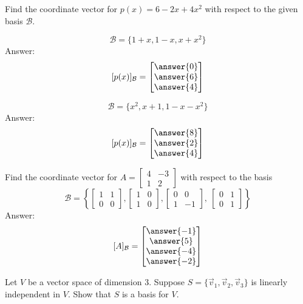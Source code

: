 \documentclass{ximera}
\begin{document}
\begin{problem}
Find the coordinate vector for $p(x)=6-2x+4x^2$ with respect to the given basis $\mathcal{B}$.

\begin{problem}\label{prob:coordvectors1}
$$\mathcal{B}=\{1 + x, 1 - x, x + x^{2}\}$$
Answer:
$$[p(x)]_{\mathcal{B}}=\begin{bmatrix}\answer{0}\\\answer{6}\\\answer{4}\end{bmatrix}$$
\end{problem}

\begin{problem}\label{prob:coordvectors2}
$$\mathcal{B}=\{x^{2}, x + 1, 1 - x - x^{2}\}$$
Answer:
$$[p(x)]_{\mathcal{B}}=\begin{bmatrix}\answer{8}\\\answer{2}\\\answer{4}\end{bmatrix}$$
\end{problem}
\end{problem}
\begin{problem}\label{prob:coordvectors3}
Find the coordinate vector for $A=\begin{bmatrix}4&-3\\1&2\end{bmatrix}$ with respect to the basis
$$\mathcal{B}=
\left\{
\begin{bmatrix}
1 & 1 \\
0 & 0
\end{bmatrix}
, 
\begin{bmatrix}
1 & 0 \\
1 & 0
\end{bmatrix}
, 
\begin{bmatrix}
0 & 0 \\
1 & -1
\end{bmatrix}
,\
\begin{bmatrix}
0 & 1 \\
0 & 1
\end{bmatrix}
\right\}$$ 
Answer:
$$[A]_{\mathcal{B}}=\begin{bmatrix}\answer{-1}\\\answer{5}\\\answer{-4}\\\answer{-2}\end{bmatrix}$$
\end{problem}

\begin{problem}\label{prob:basisforabstractvectspace}
Let $V$ be a vector space of dimension $3$.  Suppose $S=\{\vec{v}_1, \vec{v}_2, \vec{v}_3\}$ is linearly independent in $V$.  Show that $S$ is a basis for $V$.
\end{problem}
\end{document}

